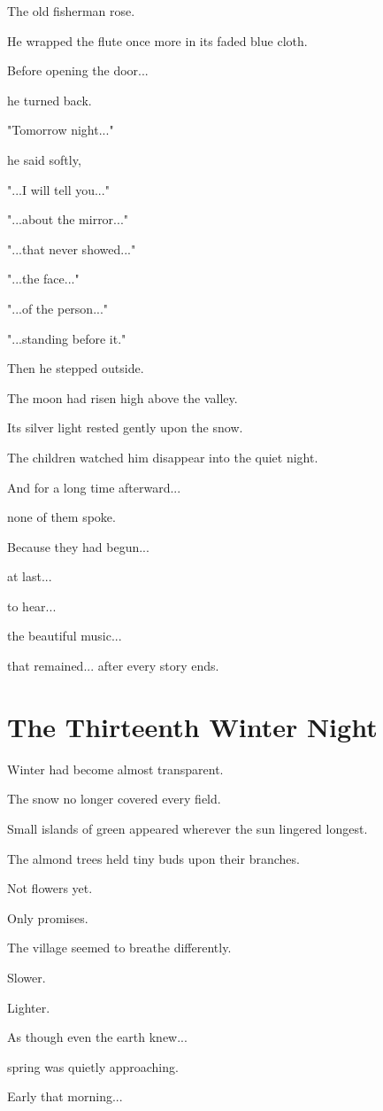 \documentclass[12pt,openany]{book}
\begin{document}
The old fisherman rose.

He wrapped the flute once more in its faded blue cloth.

Before opening the door...

he turned back.

"Tomorrow night..."

he said softly,

"...I will tell you..."

"...about the mirror..."

"...that never showed..."

"...the face..."

"...of the person..."

"...standing before it."

Then he stepped outside.

The moon had risen high above the valley.

Its silver light rested gently upon the snow.

The children watched him disappear into the quiet night.

And for a long time afterward...

none of them spoke.

Because they had begun...

at last...

to hear...

the beautiful music...

that remained...
after every story ends.
\chapter{The Thirteenth Winter Night}

Winter had become almost transparent.

The snow no longer covered every field.

Small islands of green appeared wherever the sun lingered longest.

The almond trees held tiny buds upon their branches.

Not flowers yet.

Only promises.

The village seemed to breathe differently.

Slower.

Lighter.

As though even the earth knew...

spring was quietly approaching.

Early that morning...
\end{document}
